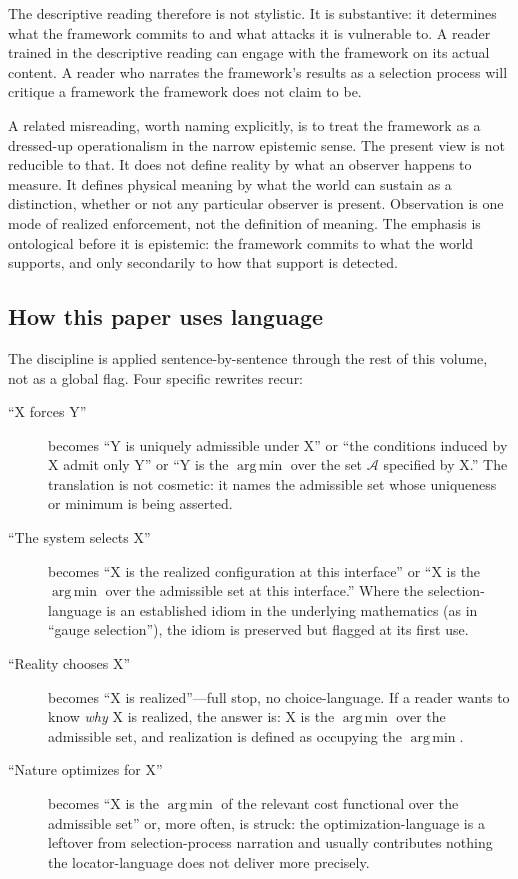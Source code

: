 \documentclass[11pt]{article}
\newcommand{\argmin}{\mathop{\mathrm{arg\,min}}}
\begin{document}
The descriptive reading therefore is not stylistic. It is substantive: it determines what the framework commits to and what attacks it is vulnerable to. A reader trained in the descriptive reading can engage with the framework on its actual content. A reader who narrates the framework's results as a selection process will critique a framework the framework does not claim to be.

A related misreading, worth naming explicitly, is to treat the framework as a dressed-up operationalism in the narrow epistemic sense. The present view is not reducible to that. It does not define reality by what an observer happens to measure. It defines physical meaning by what the world can sustain as a distinction, whether or not any particular observer is present. Observation is one mode of realized enforcement, not the definition of meaning. The emphasis is ontological before it is epistemic: the framework commits to what the world supports, and only secondarily to how that support is detected.

\subsection{How this paper uses language}\label{sec:descriptive_language}

The discipline is applied sentence-by-sentence through the rest of this volume, not as a global flag. Four specific rewrites recur:

\begin{description}
    \item[``X forces Y''] becomes ``Y is uniquely admissible under X'' or ``the conditions induced by X admit only Y'' or ``Y is the $\argmin$ over the set $\mathcal{A}$ specified by X.'' The translation is not cosmetic: it names the admissible set whose uniqueness or minimum is being asserted.
    \item[``The system selects X''] becomes ``X is the realized configuration at this interface'' or ``X is the $\argmin$ over the admissible set at this interface.'' Where the selection-language is an established idiom in the underlying mathematics (as in ``gauge selection''), the idiom is preserved but flagged at its first use.
    \item[``Reality chooses X''] becomes ``X is realized''---full stop, no choice-language. If a reader wants to know \emph{why} X is realized, the answer is: X is the $\argmin$ over the admissible set, and realization is defined as occupying the $\argmin$.
    \item[``Nature optimizes for X''] becomes ``X is the $\argmin$ of the relevant cost functional over the admissible set'' or, more often, is struck: the optimization-language is a leftover from selection-process narration and usually contributes nothing the locator-language does not deliver more precisely.
\end{description}
\end{document}
